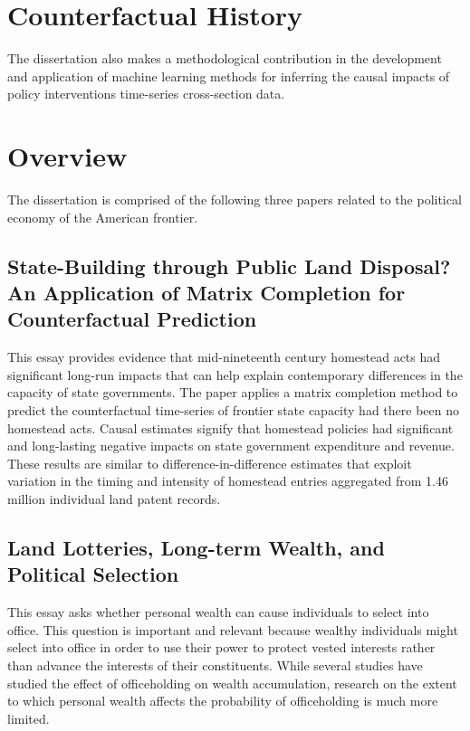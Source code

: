 \section{Counterfactual History}

The dissertation also makes a methodological contribution in the development and application of machine learning methods for inferring the causal impacts of policy interventions time-series cross-section data. 


\section{Overview}

The dissertation is comprised of the following three papers related to the political economy of the American frontier. 

\subsection{State-Building through Public Land Disposal? An Application of Matrix Completion for Counterfactual Prediction}
This essay provides evidence that mid-nineteenth century homestead acts had significant long-run impacts that can help explain contemporary differences in the capacity of state governments. The paper applies a matrix completion method to predict the counterfactual time-series of frontier state capacity had there been no homestead acts. Causal estimates signify that homestead policies had significant and long-lasting negative impacts on state government expenditure and revenue. These results are similar to difference-in-difference estimates that exploit variation in the timing and intensity of homestead entries aggregated from 1.46 million individual land patent records.

\subsection{Land Lotteries, Long-term Wealth, and Political Selection} 
This essay asks whether personal wealth can cause individuals to select into office. This question is important and relevant because wealthy individuals might select into office in order to use their power to protect vested interests rather than advance the interests of their constituents. While several studies have studied the effect of officeholding on wealth accumulation, research on the extent to which personal wealth affects the probability of officeholding is much more limited.

